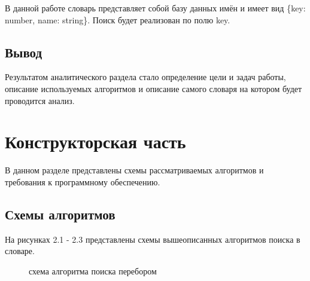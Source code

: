 \documentclass[12pt,a4paper]{report}
\begin{document}
В данной работе словарь представляет собой базу данных имён и имеет вид \{key: number, name: string\}. Поиск 
будет реализован по полю key.

\section{Вывод}

Результатом аналитического раздела стало определение цели и задач работы, описание используемых алгоритмов и 
описание самого словаря на котором будет проводится анализ.

\newpage
\chapter{Конструкторская часть}

В данном разделе представлены схемы рассматриваемых алгоритмов и требования к программному 
обеспечению.

\section{Схемы алгоритмов}

На рисунках 2.1 - 2.3 представлены схемы вышеописанных алгоритмов поиска в словаре.

\begin{figure}[h]
    \caption{схема алгоритма поиска перебором}
    \label{fig:image}
\end{figure}
\end{document}
